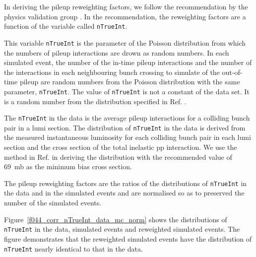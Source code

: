 In deriving the pileup reweighting factors, we follow the
recommendation by the physics validation group
\cite{twiki-PdmVPileUpDescription, twiki-PileupJSONFileforData}. In
the recommendation, the reweighting factors are a function of the
variable called \verb!nTrueInt!.

This variable \verb!nTrueInt! is the parameter of the Poisson
distribution from which the numbers of pileup interactions are drown
as random numbers. In each simulated event, the number of the in-time
pileup interactions and the number of the interactions in each
neighbouring bunch crossing to simulate of the out-of-time pileup are
random numbers from the Poisson distribution with the same parameter,
\verb!nTrueInt!. The value of \verb!nTrueInt! is not a constant of the
data set. It is a random number from the distribution specified in
Ref. \cite{github-mix_2015_25ns_Startup_PoissonOOTPU_cfi}.

The \verb!nTrueInt! in the data is the average pileup interactions for
a colliding bunch pair in a lumi section. The distribution of
\verb!nTrueInt! in the data is derived from the measured instantaneous
luminosity for each colliding bunch pair in each lumi section and the
cross section of the total inelastic pp interaction. We use the method
in Ref. \cite{twiki-PileupJSONFileforData} in deriving the
distribution with the recommended value of 69~mb as the minimum bias
cross section.

The pileup reweighting factors are the ratios of the distributions of
\verb!nTrueInt! in the data and in the simulated events and are
normalised so as to preserved the number of the simulated events.

Figure~\ref{f044_corr_nTrueInt_data_mc_norm} shows the distributions
of \verb!nTrueInt! in the data, simulated events and reweighted
simulated events. The figure demonstrates that the reweighted
simulated events have the distribution of \verb!nTrueInt! nearly
identical to that in the data.

